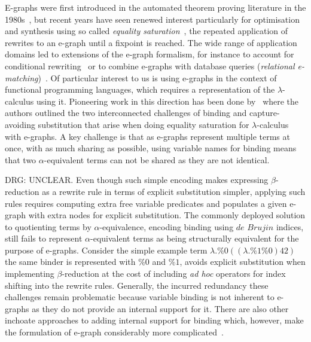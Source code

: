 \documentclass[peerreviewcls]{IEEEtran}
\begin{document}
E-graphs were first introduced in the automated theorem proving literature in the 1980s~\cite{nelson1980techniques}, but recent years have seen renewed interest particularly for optimisation and synthesis using so called \emph{equality saturation}~\cite{10.1145/1594834.1480915, griggio_proceedings_2022, EggPaper,flatt_small_2022}, the repeated application of rewrites to an e-graph until a fixpoint is reached. 
The wide range of application domains led to extensions of the e-graph formalism, for instance to account for conditional rewriting~\cite{singher2023colored} or  to combine e-graphs with database queries (\emph{relational e-matching})~\cite{zhang_relational_2022}.
Of particular interest to us is using e-graphs in the context of functional programming languages, which requires a representation of the $\lambda$-calculus using it. 
Pioneering work in this direction has been done by~\cite{koehler2022sketchguided} where
the authors outlined the two interconnected challenges of binding and capture-avoiding substitution that arise when doing equality saturation for $\lambda$-calculus with e-graphs.
A key challenge is that as e-graphs represent multiple terms at once, with as much sharing as possible, using variable names for binding means that two $\alpha$-equivalent terms can not be shared as they are not identical.

\begin{red}
DRG: UNCLEAR. Even though such simple encoding makes expressing $\beta$-reduction as a rewrite rule in terms of explicit substitution simpler, applying such rules requires computing extra free variable predicates and populates a given e-graph with extra nodes for explicit substitution.
The commonly deployed solution to quotienting terms by $\alpha$-equivalence, encoding binding using $\textit{de Brujin}$ indices, still fails to represent $\alpha$-equivalent terms as being structurally equivalent for the purpose of e-graphs. 
Consider the simple example term $\lambda . \%0 ((\lambda . \%1 \%0) 42)$ the same binder is represented with $\%0$ and $\%1$, avoids explicit substitution when implementing $\beta$-reduction at the cost of including \textit{ad hoc} operators for index shifting into the rewrite rules.
Generally, the incurred redundancy these challenges remain problematic because variable binding is not inherent to e-graphs as they do not provide an internal support for it.
There are also other inchoate approaches to adding internal support for binding which, however, make the formulation of e-graph considerably more complicated~\cite{slotted-egraphs}.
\end{red}
\end{document}
